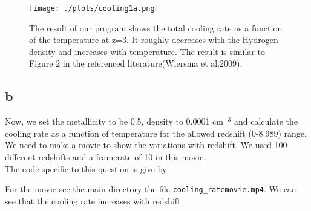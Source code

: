 \begin{figure}[h!]
  \centering
  \texttt{[image: ./plots/cooling1a.png]}
  \caption{The result of our program shows the total cooling rate as a function of the temperature at z=3.
   It roughly decreases with the Hydrogen density and increases with temperature. The result is similar to Figure 2 in the referenced literature(Wiersma et al.2009).}
  \label{fig1}
\end{figure}

\subsection{b}
Now, we set the metallicity to be 0.5, density to 0.0001 cm$^{-3}$ and calculate the cooling rate as a function of temperature for the allowed redshift (0-8.989) range.
We need to make a movie to show the variations with redshift. We used 100 different redshifts and a framerate of 10 in this movie.\\

The code specific to this question is give by:


For the movie see the main directory the file \texttt{cooling\_ratemovie.mp4}. We can see that the cooling rate increases with redshift.
